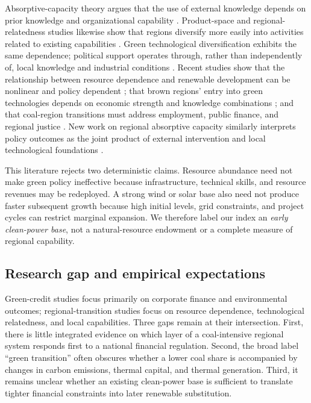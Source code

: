 \documentclass[11pt]{article}
\begin{document}
Absorptive-capacity theory argues that the use of external knowledge depends on prior knowledge and organizational capability \parencite{cohenlevinthal1990}. Product-space and regional-relatedness studies likewise show that regions diversify more easily into activities related to existing capabilities \parencite{hidalgoetal2007,neffkeetal2011}. Green technological diversification exhibits the same dependence; political support operates through, rather than independently of, local knowledge and industrial conditions \parencite{santoalhaboschma2021}. Recent studies show that the relationship between resource dependence and renewable development can be nonlinear and policy dependent \parencite{zhangetal2024resource}; that brown regions' entry into green technologies depends on economic strength and knowledge combinations \parencite{grashofbasilico2025}; and that coal-region transitions must address employment, public finance, and regional justice \parencite{healybarry2017,carleyetal2018,demeterova2024,tassikittner2024,perettoetal2025}. New work on regional absorptive capacity similarly interprets policy outcomes as the joint product of external intervention and local technological foundations \parencite{zhaoetal2026}.

This literature rejects two deterministic claims. Resource abundance need not make green policy ineffective because infrastructure, technical skills, and resource revenues may be redeployed. A strong wind or solar base also need not produce faster subsequent growth because high initial levels, grid constraints, and project cycles can restrict marginal expansion. We therefore label our index an \emph{early clean-power base}, not a natural-resource endowment or a complete measure of regional capability.

\subsection{Research gap and empirical expectations}

Green-credit studies focus primarily on corporate finance and environmental outcomes; regional-transition studies focus on resource dependence, technological relatedness, and local capabilities. Three gaps remain at their intersection. First, there is little integrated evidence on which layer of a coal-intensive regional system responds first to a national financial regulation. Second, the broad label ``green transition'' often obscures whether a lower coal share is accompanied by changes in carbon emissions, thermal capital, and thermal generation. Third, it remains unclear whether an existing clean-power base is sufficient to translate tighter financial constraints into later renewable substitution.
\end{document}
